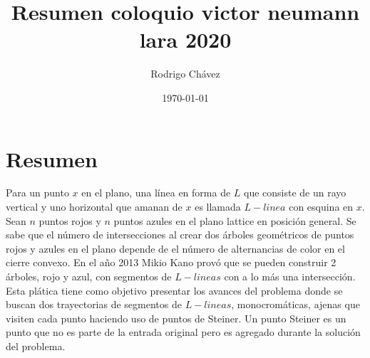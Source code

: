\documentclass[11pt,a4paper]{article}
\title{Resumen coloquio victor neumann lara 2020}
\date{\today}
\author{Rodrigo Chávez}
\begin{document}
\maketitle
\section{Resumen}
Para un punto $x$ en el plano, una línea en forma de $L$ que consiste de un rayo vertical y uno horizontal que amanan de $x$ es llamada $L-linea$ con esquina en $x$. Sean $n$ puntos rojos y $n$ puntos azules en el plano lattice en posición general. Se sabe que el número de intersecciones al crear dos árboles geométricos de puntos rojos y azules en el plano depende de el número de alternancias de color en el cierre convexo. En el año 2013 Mikio Kano provó que se pueden construir 2 árboles, rojo y azul, con segmentos de $L-lineas$ con a lo más una intersección. Esta plática tiene como objetivo presentar los avances del problema donde se buscan dos trayectorias de segmentos de $L-lineas$, monocromáticas, ajenas que visiten cada punto haciendo uso de puntos de Steiner. Un punto Steiner es un punto que no es parte de la entrada original pero es agregado durante la solución del problema.
\end{document}
